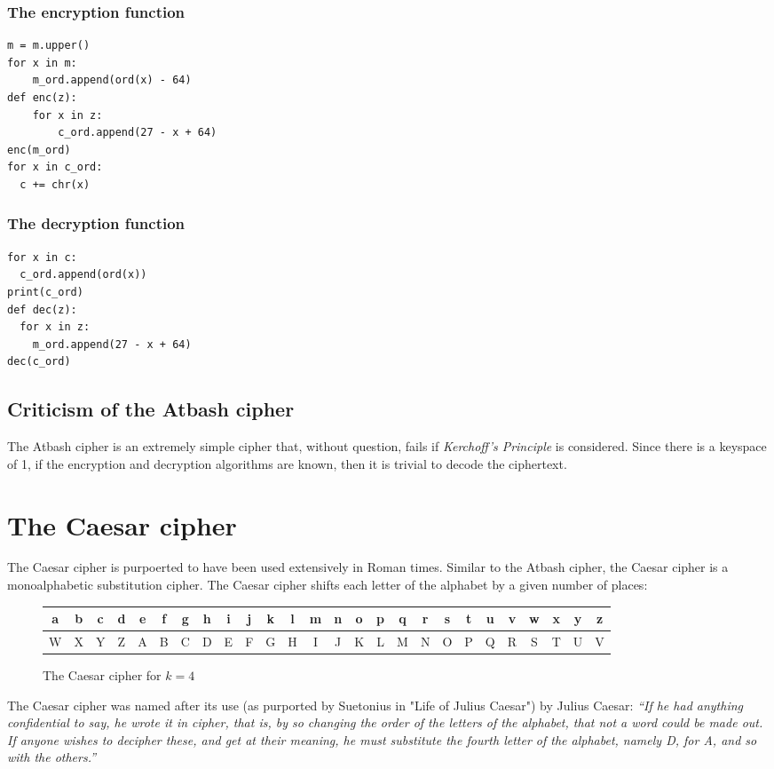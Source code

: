 \documentclass{AIAA}
\begin{document}
\subsubsection{The encryption function}
\begin{verbatim}
m = m.upper()
for x in m:
    m_ord.append(ord(x) - 64)
def enc(z):
    for x in z:
        c_ord.append(27 - x + 64)
enc(m_ord)
for x in c_ord:
  c += chr(x)
\end{verbatim}

\subsubsection{The decryption function}
\begin{verbatim}
for x in c:
  c_ord.append(ord(x))
print(c_ord)
def dec(z):
  for x in z:
    m_ord.append(27 - x + 64)
dec(c_ord)
\end{verbatim}

\subsection{Criticism of the Atbash cipher}
The Atbash cipher is an extremely simple cipher that, without question, fails if \textit{Kerchoff's Principle} is considered. Since there is a keyspace of 1, if the encryption and decryption algorithms are known, then it is trivial to decode the ciphertext. 

\section{The Caesar cipher}
The Caesar cipher is purpoerted to have been used extensively in Roman times. Similar to the Atbash cipher, the Caesar cipher is a monoalphabetic substitution cipher. The Caesar cipher shifts each letter of the alphabet by a given number of places:

\begin{figure}[h!]
\begin{tabular}{|c|c|c|c|c|c|c|c|c|c|c|c|c|c|c|c|c|c|c|c|c|c|c|c|c|c|}
\hline
a & b & c & d & e & f & g & h & i & j & k & l & m & n & o & p & q & r & s & t & u & v & w & x & y & z \\ \hline
W & X & Y & Z & A & B & C & D & E & F & G & H & I & J & K & L & M & N & O & P & Q & R & S & T & U & V \\
\hline
\end{tabular}
\caption{The Caesar cipher for $k=4$}
\end{figure}
The Caesar cipher was named after its use (as purported by Suetonius in "Life of Julius Caesar") by Julius Caesar: \textit{``If he had anything confidential to say, he wrote it in cipher, that is, by so changing the order of the letters of the alphabet, that not a word could be made out. If anyone wishes to decipher these, and get at their meaning, he must substitute the fourth letter of the alphabet, namely D, for A, and so with the others.''} 
\end{document}
